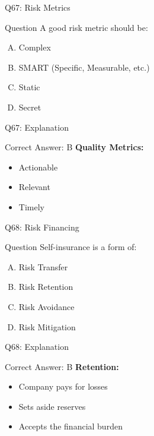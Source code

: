 \documentclass{beamer}
\begin{document}
			\begin{frame}{Q67: Risk Metrics}
				\begin{block}{Question}
					A good risk metric should be:
				\end{block}
				\begin{enumerate}[(A)]
					\item Complex
					\item SMART (Specific, Measurable, etc.)
					\item Static
					\item Secret
				\end{enumerate}
			\end{frame}
			\begin{frame}{Q67: Explanation}
				\begin{block}{Correct Answer: B}
					\textbf{Quality Metrics:}
					\begin{itemize}
						\item Actionable
						\item Relevant
						\item Timely
					\end{itemize}
				\end{block}
			\end{frame}
			
			\begin{frame}{Q68: Risk Financing}
				\begin{block}{Question}
					Self-insurance is a form of:
				\end{block}
				\begin{enumerate}[(A)]
					\item Risk Transfer
					\item Risk Retention
					\item Risk Avoidance
					\item Risk Mitigation
				\end{enumerate}
			\end{frame}
			\begin{frame}{Q68: Explanation}
				\begin{block}{Correct Answer: B}
					\textbf{Retention:}
					\begin{itemize}
						\item Company pays for losses
						\item Sets aside reserves
						\item Accepts the financial burden
					\end{itemize}
				\end{block}
			\end{frame}
			
\end{document}
